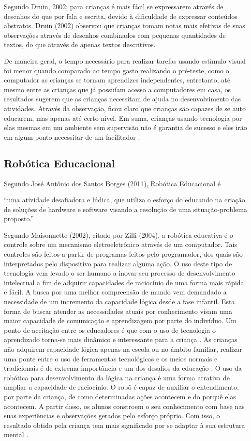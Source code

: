 Segundo Druin, 2002; para crianças é mais fácil se expressarem através de desenhos do que por fala e escrita, devido à dificuldade de expressar conteúdos abstratos. Druin (2002) observou que crianças tomam notas mais efetivas de suas observações através de desenhos combinados com pequenas quantidades de textos, do que através de apenas textos descritivos.

De maneira geral, o tempo necessário para realizar tarefas usando estímulo visual foi menor quando comparado ao tempo gasto realizando o pré-teste, como o computador as crianças se tornam aprendizes independentes, entretanto, até mesmo entre as crianças que já possuíam acesso a computadores em casa, os resultados sugerem que as crianças necessitam de ajuda no desenvolvimento das atividades. Através da observação, ficou claro que crianças são capazes de se auto educarem, mas apenas até certo nível. Em suma, crianças usando tecnologia por elas mesmas em um ambiente sem supervisão não é garantia de sucesso e eles irão em algum ponto necessitar de um facilitador \cite{husnoo:2013}.

\subsection{Robótica Educacional}

Segundo José Antônio dos Santos Borges (2011), Robótica Educacional é

“uma atividade desafiadora e lúdica, que utiliza o esforço do educando na criação de soluções de hardware e software visando a resolução de uma situação-problema proposto.”

Segundo Maisonnette (2002), citado por Zilli (2004), a robótica educativa é o controle sobre um mecanismo eletroeletrônico através de um computador. Tais controles são feitos a partir de programas feitos pelo programador, dos quais são interpretados pelo dispositivo para realizar alguma ação.
O uso deste tipo de tecnologia vem levado o ser humano a inovar seu processo de desenvolvimento intelectual a fim de adquirir capacidades de raciocínio de uma forma mais rápida e fácil. A busca por uma melhor compreensão de mundo vem demandado a necessidade de um incremento da capacidade lógica desde a fase infantil. Esta forma de buscar atender as necessidades atuais por conhecimento visam uma maior capacidade de comunicação e aprendizagem por parte do indivíduo.
Um ponto de aceitação entre os educadores é que com o uso de tecnologia o aprendizado torna-se mais dinâmico e interessante para a criança \cite{zilli:2004}. As crianças não adquirem capacidade lógica apenas na escola ou no âmbito familiar, realizar uma ponte entre o uso de ferramentas tecnológicas e os meios normais e tradicionais é de extrema importância e um dos desafios da educação \cite{yus:2004}.
O uso da robótica para desenvolvimento da lógica na criança é uma forma atrativa de ampliar a capacidade de raciocínio. O robô é capaz de auxiliar o entendimento, por parte da criança, de como determinadas ações acontecem e do porquê elas acontecem. A partir disso, os alunos constroem o seu conhecimento com base nas suas experiências e observações gerados pelo esforço próprio. Com isso, o resultado obtido pela criança tem mais significado por se adaptar à sua estrutura mental \cite{zilli:2004}.

